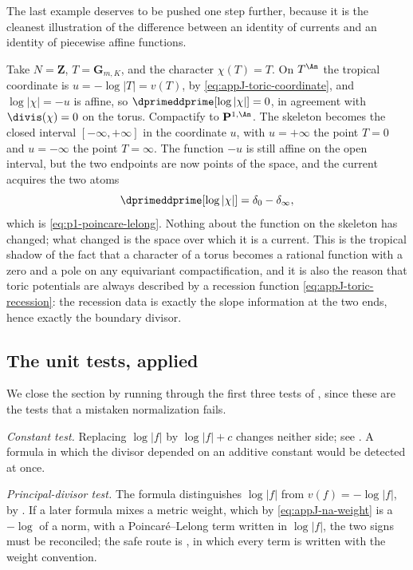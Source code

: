 The last example deserves to be pushed one step further, because it is the
cleanest illustration of the difference between an identity of currents and
an identity of piecewise affine functions.

\begin{example}
\label{ex:ch15-toric-compactified}
Take $N=\mathbf Z$, $T=\mathbf G_{m,K}$, and the character $\chi(T)=T$.  On
$T^{\An}$ the tropical coordinate is $u=-\log|T|=v(T)$, by
\eqref{eq:appJ-toric-coordinate}, and $\log|\chi|=-u$ is affine, so
$\dprimeddprime[\log|\chi|]=0$, in agreement with $\divis(\chi)=0$ on the
torus.  Compactify to $\mathbf P^{1,\An}$.  The skeleton becomes the closed
interval $[-\infty,+\infty]$ in the coordinate $u$, with $u=+\infty$ the
point $T=0$ and $u=-\infty$ the point $T=\infty$.  The function $-u$ is still
affine on the open interval, but the two endpoints are now points of the
space, and the current acquires the two atoms
\[
 \dprimeddprime[\log|\chi|]=\delta_{0}-\delta_{\infty} ,
\]
which is \eqref{eq:p1-poincare-lelong}.  Nothing about the function on the
skeleton has changed; what changed is the space over which it is a current.
This is the tropical shadow of the fact that a character of a torus becomes a
rational function with a zero and a pole on any equivariant
compactification, and it is also the reason that toric potentials are always
described by a recession function \eqref{eq:appJ-toric-recession}: the
recession data is exactly the slope information at the two ends, hence
exactly the boundary divisor.
\end{example}

\subsection{The unit tests, applied}
\label{sec:ch15-unit-tests}

We close the section by running  through the
first three tests of , since these are the tests
that a mistaken normalization fails.

\emph{Constant test.}  Replacing $\log|f|$ by $\log|f|+c$ changes neither
side; see .  A formula in which the divisor
depended on an additive constant would be detected at once.

\emph{Principal-divisor test.}  The formula distinguishes $\log|f|$ from
$v(f)=-\log|f|$, by .  If a later formula
mixes a metric weight, which by \eqref{eq:appJ-na-weight} is a
$-\log$ of a norm, with a Poincar\'e--Lelong term written in $\log|f|$, the
two signs must be reconciled; the safe route is
, in which every term is written with the weight
convention.

